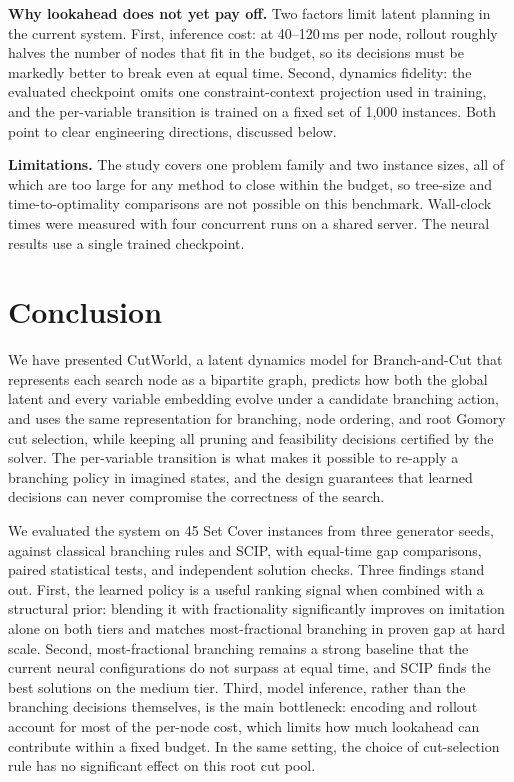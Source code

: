\documentclass[11pt,a4paper]{article}
\begin{document}
\textbf{Why lookahead does not yet pay off.}
Two factors limit latent planning in the current system. First, inference cost: at 40--120\,ms per node, rollout roughly halves the number of nodes that fit in the budget, so its decisions must be markedly better to break even at equal time. Second, dynamics fidelity: the evaluated checkpoint omits one constraint-context projection used in training, and the per-variable transition is trained on a fixed set of 1{,}000 instances. Both point to clear engineering directions, discussed below.

\textbf{Limitations.}
The study covers one problem family and two instance sizes, all of which are too large for any method to close within the budget, so tree-size and time-to-optimality comparisons are not possible on this benchmark. Wall-clock times were measured with four concurrent runs on a shared server. The neural results use a single trained checkpoint.

\section{Conclusion}

We have presented CutWorld, a latent dynamics model for Branch-and-Cut that represents each search node as a bipartite graph, predicts how both the global latent and every variable embedding evolve under a candidate branching action, and uses the same representation for branching, node ordering, and root Gomory cut selection, while keeping all pruning and feasibility decisions certified by the solver. The per-variable transition is what makes it possible to re-apply a branching policy in imagined states, and the design guarantees that learned decisions can never compromise the correctness of the search.

We evaluated the system on 45 Set Cover instances from three generator seeds, against classical branching rules and SCIP, with equal-time gap comparisons, paired statistical tests, and independent solution checks. Three findings stand out. First, the learned policy is a useful ranking signal when combined with a structural prior: blending it with fractionality significantly improves on imitation alone on both tiers and matches most-fractional branching in proven gap at hard scale. Second, most-fractional branching remains a strong baseline that the current neural configurations do not surpass at equal time, and SCIP finds the best solutions on the medium tier. Third, model inference, rather than the branching decisions themselves, is the main bottleneck: encoding and rollout account for most of the per-node cost, which limits how much lookahead can contribute within a fixed budget. In the same setting, the choice of cut-selection rule has no significant effect on this root cut pool.
\end{document}
